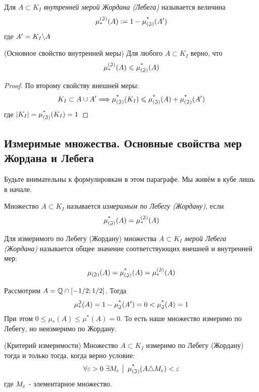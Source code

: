 \begin{definition}
	Для $A \subset K_I$ \textit{внутренней мерой Жордана (Лебега)} называется величина
	\[
		\operatorname{\mu^{(\mathfrak{J})}_*}(A) := 1 - \operatorname{\mu^*_{(\mathfrak{J})}}(A')
	\]
	где $A' = K_I \backslash A$
\end{definition}

\begin{theorem} (Основное свойство внутренней меры)
	Для любого $A \subset K_I$ верно, что
	\[
		\operatorname{\mu^{(\mathfrak{J})}_*}(A) \leqslant \operatorname{\mu^*_{(\mathfrak{J})}}(A)
	\]
\end{theorem}

\begin{proof}
	По второму свойству внешней меры:
	\[
		K_I \subset A \cup A' \Longrightarrow \operatorname{\mu^*_{(\mathfrak{J})}}(K_I) \leqslant \operatorname{\mu^*_{(\mathfrak{J})}}(A) + \operatorname{\mu^*_{(\mathfrak{J})}}(A')
	\]
	где $|K_I| = \operatorname{\mu^*_{(\mathfrak{J})}}(K_I) = 1$
\end{proof}

\subsection{Измеримые множества. Основные свойства мер Жордана и Лебега}

\begin{note}
	Будьте внимательны к формулировкам в этом параграфе. Мы живём в кубе лишь в начале.
\end{note}

\begin{definition}
	Множество $A \subset K_I$ называется \textit{измеримым по Лебегу (Жордану)}, если
	\[
		\operatorname{\mu^*_{(\mathfrak{J})}}(A) = \operatorname{\mu^{(\mathfrak{J})}_*}(A)
	\]
\end{definition}

\begin{definition}
	Для измеримого по Лебегу (Жордану) множества $A \subset K_I$ \textit{мерой Лебега (Жордана)} называется общее значение соответствующих внешней и внутренней мер:
	\[
		\operatorname{\mu_{(\mathfrak{J})}}(A) = \operatorname{\mu^*_{(\mathfrak{J})}}(A) = \operatorname{\mu^{(\mathfrak{J})}_*}(A)
	\]
\end{definition}

\begin{example}
	Рассмотрим $A = \mathbb{Q} \cap [-1/2; 1/2]$. Тогда
	\[
		\operatorname{\mu^\mathfrak{J}_*}(A) = 1 - \operatorname{\mu^*_\mathfrak{J}}(A') = 0 < \operatorname{\mu^*_\mathfrak{J}}(A) = 1
	\]
	При этом $0 \le \mu_*(A) \le \mu^*(A) = 0$. То есть наше множество измеримо по Лебегу, но неизмеримо по Жордану.
\end{example}

\begin{theorem} (Критерий измеримости)
	Множество $A \subset K_I$ измеримо по Лебегу (Жордану) тогда и только тогда, когда верно условие:
	\[
		\forall \varepsilon > 0\ \exists M_\varepsilon \ \big|\  \operatorname{\mu^*_{(\mathfrak{J})}}(A \triangle M_\varepsilon) < \varepsilon
	\]
	где $M_\varepsilon$ - элементарное множество.
\end{theorem}

